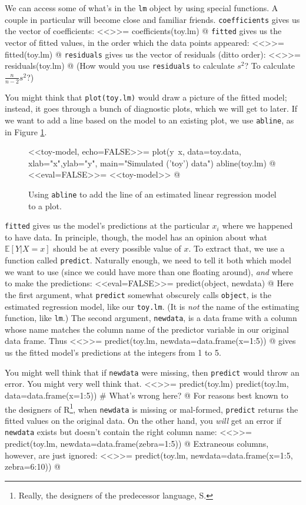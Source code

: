 \documentclass{article}
\newcommand{\Expect}[1]{\mathbb{E}\left[ #1 \right]}
\begin{document}
We can access some of what's in the \texttt{lm} object by using special
functions.  A couple in particular will become close and familiar friends.
\texttt{coefficients} gives us the vector of coefficients:
<<>>=
coefficients(toy.lm)
@
\texttt{fitted} gives us the vector of fitted values, in the order which
the data points appeared:
<<>>=
fitted(toy.lm)
@
\texttt{residuals} gives us the vector of residuals (ditto order):
<<>>=
residuals(toy.lm)
@
(How would you use \texttt{residuals} to calculate $s^2$?  To calculate
$\frac{n}{n-2}s^2$?)

You might think that \texttt{plot(toy.lm)} would draw a picture of the fitted
model; instead, it goes through a bunch of diagnostic plots, which we will get
to later.  If we want to add a line based on the model to an existing plot, we
use \texttt{abline}, as in Figure \ref{fig:toy-model}.

\begin{figure}
<<toy-model, echo=FALSE>>=
plot(y~x, data=toy.data, xlab="x",ylab="y", main="Simulated ('toy') data")
abline(toy.lm)
@
<<eval=FALSE>>=
<<toy-model>>
@
\caption{Using \texttt{abline} to add the line of an estimated linear
  regression model to a plot.}
\label{fig:toy-model}
\end{figure}

\texttt{fitted} gives us the model's predictions at the particular $x_i$
where we happened to have data.  In principle, though, the model has an
opinion about what $\Expect{Y|X=x}$ should be at every possible value of
$x$.  To extract that, we use a function called \texttt{predict}.  Naturally
enough, we need to tell it both which model we want to use (since we could
have more than one floating around), {\em and} where to make
the predictions:
<<eval=FALSE>>=
predict(object, newdata)
@
Here the first argument, what \texttt{predict} somewhat obscurely calls
\texttt{object}, is the estimated regression model, like our \texttt{toy.lm}.
(It is {\em not} the name of the estimating function, like \texttt{lm}.)
The second argument, \texttt{newdata}, is a data frame with a column whose
name matches the column name of the predictor variable in our original
data frame.  Thus
<<>>=
predict(toy.lm, newdata=data.frame(x=1:5))
@
gives us the fitted model's predictions at the integers from 1 to 5.

You might well think that if \texttt{newdata} were missing, then
\texttt{predict} would throw an error.  You might very well think that.
<<>>=
predict(toy.lm)
predict(toy.lm, data=data.frame(x=1:5))  # What's wrong here?
@
For reasons best known to the designers of R\footnote{Really, the designers of
  the predecessor language, S.}, when \texttt{newdata} is missing or
mal-formed, \texttt{predict} returns the fitted values on the original data.
On the other hand, you {\em will} get an error if \texttt{newdata}
exists but doesn't contain the right column name:
<<>>=
predict(toy.lm, newdata=data.frame(zebra=1:5))
@
Extraneous columns, however, are just ignored:
<<>>=
predict(toy.lm, newdata=data.frame(x=1:5, zebra=6:10))
@
\end{document}
